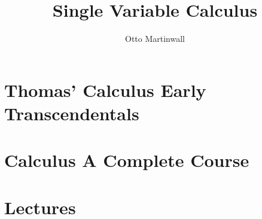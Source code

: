 

\title{Single Variable Calculus}
\author{Otto Martinwall}


\maketitle
\tableofcontents
\newpage


\section{Thomas' Calculus Early Transcendentals}


\section{Calculus A Complete Course}



\section{Lectures}

